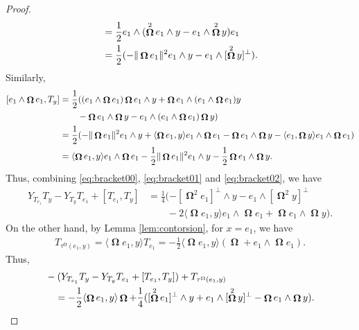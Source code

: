 \documentclass[12pt]{amsart}
\numberwithin{numbering}{section}
\theoremstyle{plain}
\theoremstyle{definition}
\theoremstyle{remark}
\numberwithin{equation}{section}
\DeclareMathOperator{\oo}{\mathbf{\Omega}}
\DeclareMathOperator{\mg}{\Omega}
\begin{document}
\begin{proof}
\begin{align}
&= \frac{1}{2} e_1 \wedge (\oo^2 e_1 \wedge y - e_1 \wedge \oo^2 y) e_1 \notag \\ 
&= \frac{1}{2} (-\Vert \oo e_1 \Vert^2 e_1 \wedge y - e_1 \wedge [\oo^2 y]^\perp). \notag
\end{align}
Similarly,
\begin{align} \label{eq:bracket02}
[e_1 \wedge \oo e_1, T_y]
&= \frac{1}{2} ((e_1 \wedge \oo e_1) \oo e_1 \wedge y + \oo e_1 \wedge (e_1 \wedge \oo e_1) y \\ 
&\quad \quad - \oo e_1 \wedge \oo y - e_1 \wedge (e_1 \wedge \oo e_1) \oo y ) \notag \\ 
&= \frac{1}{2} (- \Vert \oo e_1 \Vert^2 e_1 \wedge y + \langle \oo e_1, y \rangle e_1 \wedge \oo e_1 - \oo e_1 \wedge \oo y - \langle e_1, \oo y \rangle e_1 \wedge \oo e_1) \notag \\ 
&= \langle \oo e_1, y \rangle e_1 \wedge \oo e_1 - \frac{1}{2} \Vert \oo e_1 \Vert^2 e_1 \wedge y - \frac{1}{2} \oo e_1 \wedge \oo y. \notag
\end{align}
Thus, combining \eqref{eq:bracket00}, \eqref{eq:bracket01} and \eqref{eq:bracket02}, we have 
\begin{align*}
Y_{T_{e_1}} T_y - Y_{T_y} T_{e_1} + [T_{e_1}, T_y] 
&= \frac{1}{4} (- [\oo^2 e_1]^\perp \wedge y - e_1 \wedge [\oo^2 y]^\perp \\ 
&\quad \quad - 2 \langle \oo e_1, y \rangle e_1 \wedge \oo e_1 + \oo e_1 \wedge \oo y).
\end{align*}
On the other hand, by Lemma \ref{lem:contorsion}, for $x = e_1$, we have
\begin{align*}
T_{\tau^{\mg}({e_1}, y)} = \langle \oo e_1, y \rangle T_{e_1} = - \frac{1}{2} \langle \oo e_1, y \rangle (\oo + e_1 \wedge \oo e_1).
\end{align*}
Thus, 
\begin{align} \label{eq:curv1}
&- (Y_{T_{e_1}} T_y - Y_{T_y} T_{e_1} + [T_{e_1}, T_y]) + T_{\tau^{\mg}(e_1, y)} \\ 
&\quad = - \frac{1}{2} \langle \oo e_1, y \rangle \oo + \frac{1}{4} ([\oo^2 e_1]^\perp \wedge y + e_1 \wedge [\oo^2 y]^\perp - \oo e_1 \wedge \oo y). \notag
\end{align}

\bigskip 


\end{proof}
\end{document}
